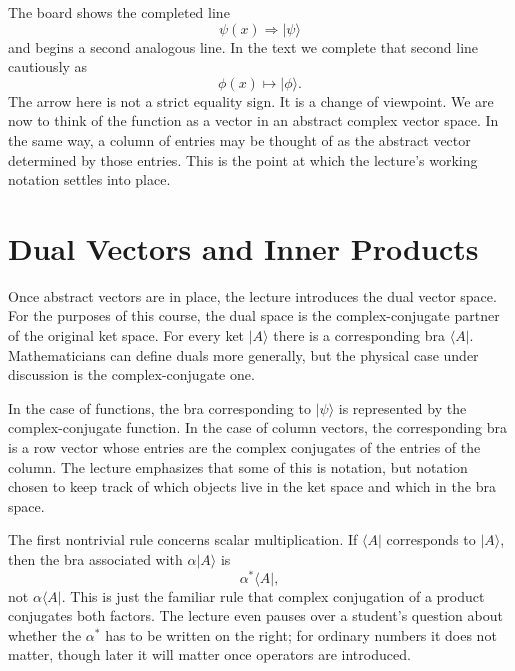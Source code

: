 The board shows the completed line
\begin{equation}
\psi(x) \Rightarrow |\psi\rangle
\end{equation}
and begins a second analogous line. In the text we complete that second line cautiously as
\begin{equation}
\phi(x) \mapsto |\phi\rangle.
\end{equation}
The arrow here is not a strict equality sign. It is a change of viewpoint. We are now to think of the function as a vector in an abstract complex vector space. In the same way, a column of entries may be thought of as the abstract vector determined by those entries. This is the point at which the lecture's working notation settles into place.

\section{Dual Vectors and Inner Products}

Once abstract vectors are in place, the lecture introduces the dual vector space. For the purposes of this course, the dual space is the complex-conjugate partner of the original ket space. For every ket \(|A\rangle\) there is a corresponding bra \(\langle A|\). Mathematicians can define duals more generally, but the physical case under discussion is the complex-conjugate one.

In the case of functions, the bra corresponding to \(|\psi\rangle\) is represented by the complex-conjugate function. In the case of column vectors, the corresponding bra is a row vector whose entries are the complex conjugates of the entries of the column. The lecture emphasizes that some of this is notation, but notation chosen to keep track of which objects live in the ket space and which in the bra space.

The first nontrivial rule concerns scalar multiplication. If \(\langle A|\) corresponds to \(|A\rangle\), then the bra associated with \(\alpha |A\rangle\) is
\begin{equation}
\alpha^* \langle A|,
\end{equation}
not \(\alpha \langle A|\). This is just the familiar rule that complex conjugation of a product conjugates both factors. The lecture even pauses over a student's question about whether the \(\alpha^*\) has to be written on the right; for ordinary numbers it does not matter, though later it will matter once operators are introduced.

